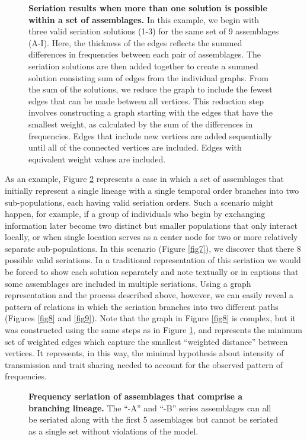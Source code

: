 \documentclass[10pt,letterpaper]{article}
\begin{document}
\begin{figure}[h]
\caption{{\bf Seriation results when more than one solution is possible within a set of assemblages.} In this example, we begin with three valid seriation solutions (1-3) for the same set of 9 assemblages (A-I). Here, the thickness of the edges reflects the summed differences in frequencies between each pair of assemblages. The seriation solutions are then added together to create a summed solution consisting sum of edges from the individual graphs. From the sum of the solutions, we reduce the graph to include the fewest edges that can be made between all vertices. This reduction step involves constructing a graph starting with the edges that have the smallest weight, as calculated by the sum of the differences in frequencies. Edges that include new vertices are added sequentially until all of the connected vertices are included. Edges with equivalent weight values are included.}
\label{fig5}
\end{figure}


As an example, Figure \ref{fig6} represents a case in which a set of assemblages that initially represent a single lineage with a single temporal order branches into two sub-populations, each having valid seriation orders. Such a scenario might happen, for example, if a group of individuals who begin by exchanging information later become two distinct but smaller populations that only interact locally, or when single location serves as a center node for two or more relatively separate sub-populations. In this scenario (Figure \ref{fig7}), we discover that there 8 possible valid seriations. In a traditional representation of this seriation we would be forced to show each solution separately and note textually or in captions that some assemblages are included in multiple seriations. Using a graph representation and the process described above, however, we can easily reveal a pattern of relations in which the seriation branches into two different paths (Figures \ref{fig8} and \ref{fig9}).   Note that the graph in Figure \ref{fig8} is complex, but it was constructed using the same steps as in Figure \ref{fig5}, and represents the minimum set of weighted edges which capture the smallest “weighted distance” between vertices.  It represents, in this way, the minimal hypothesis about intensity of transmission and trait sharing needed to account for the observed pattern of frequencies. 

\begin{figure}[h]
\caption{{\bf Frequency seriation of assemblages that comprise a branching lineage.} The “-A” and “-B” series assemblages can all be seriated along with the first 5 assemblages but cannot be seriated as a single set without violations of the model.}
\label{fig6}
\end{figure}
\end{document}
